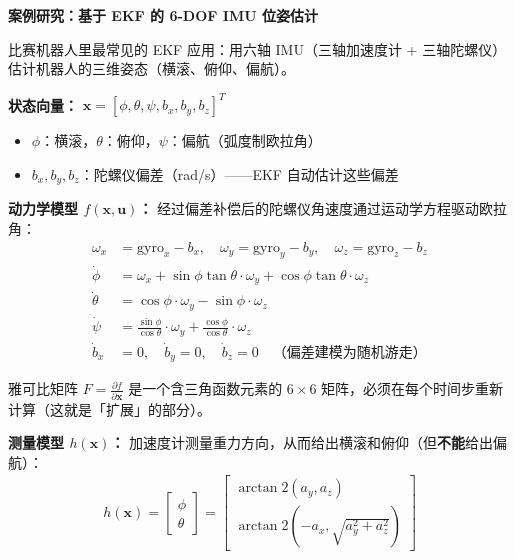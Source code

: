 \vspace{0.5em}
\begin{mdframed}[linewidth=1pt, innertopmargin=10pt, innerbottommargin=10pt]
\textbf{案例研究：基于 EKF 的 6-DOF IMU 位姿估计}

\vspace{0.3em}
比赛机器人里最常见的 EKF 应用：用六轴 IMU（三轴加速度计 + 三轴陀螺仪）估计机器人的三维姿态（横滚、俯仰、偏航）。

\textbf{状态向量：} $\mathbf{x} = [\phi, \theta, \psi, b_x, b_y, b_z]^T$
\begin{itemize}[nosep]
    \item $\phi$：横滚，$\theta$：俯仰，$\psi$：偏航（弧度制欧拉角）
    \item $b_x, b_y, b_z$：陀螺仪偏差（rad/s）——EKF 自动估计这些偏差
\end{itemize}

\textbf{动力学模型 $f(\mathbf{x}, \mathbf{u})$：} 经过偏差补偿后的陀螺仪角速度通过运动学方程驱动欧拉角：
\begin{align}
\omega_x &= \text{gyro}_x - b_x, \quad \omega_y = \text{gyro}_y - b_y, \quad \omega_z = \text{gyro}_z - b_z \\[3pt]
\dot{\phi} &= \omega_x + \sin\phi \tan\theta \cdot \omega_y + \cos\phi \tan\theta \cdot \omega_z \\
\dot{\theta} &= \cos\phi \cdot \omega_y - \sin\phi \cdot \omega_z \\
\dot{\psi} &= \frac{\sin\phi}{\cos\theta} \cdot \omega_y + \frac{\cos\phi}{\cos\theta} \cdot \omega_z \\[3pt]
\dot{b}_x &= 0, \quad \dot{b}_y = 0, \quad \dot{b}_z = 0 \quad \text{（偏差建模为随机游走）}
\end{align}

雅可比矩阵 $F = \frac{\partial f}{\partial \mathbf{x}}$ 是一个含三角函数元素的 $6 \times 6$ 矩阵，必须在每个时间步重新计算（这就是「扩展」的部分）。

\textbf{测量模型 $h(\mathbf{x})$：} 加速度计测量重力方向，从而给出横滚和俯仰（但\textbf{不能}给出偏航）：
\begin{align}
h(\mathbf{x}) = \begin{bmatrix} \phi \\ \theta \end{bmatrix} = \begin{bmatrix} \arctan2(a_y, a_z) \\ \arctan2(-a_x, \sqrt{a_y^2 + a_z^2}) \end{bmatrix}
\end{align}


\end{mdframed}
